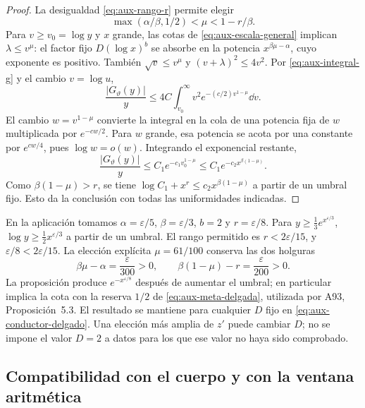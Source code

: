 \begin{proof}
La desigualdad \eqref{eq:aux-rango-r} permite elegir
\begin{equation}
 \max(\alpha/\beta,1/2)<\mu<1-r/\beta.
 \label{eq:aux-mu}
\end{equation}
Para $v\ge v_0=\log y$ y $x$ grande, las cotas de
\eqref{eq:aux-escala-general} implican $\lambda\le v^\mu$:
el factor fijo $D(\log x)^b$ se absorbe en la potencia
$x^{\beta\mu-\alpha}$, cuyo exponente es positivo.
También $\sqrt v\le v^\mu$ y $(v+\lambda)^2\le4v^2$.
Por \eqref{eq:aux-integral-g} y el cambio $v=\log u$,
\begin{equation}
 \frac{|G_\vartheta(y)|}{y}
 \le4C\int_{v_0}^\infty
                 v^2e^{-(c/2)v^{1-\mu}}\dd v.
 \label{eq:aux-cola-delgada}
\end{equation}
El cambio $w=v^{1-\mu}$ convierte la integral en la cola de
una potencia fija de $w$ multiplicada por $e^{-cw/2}$.
Para $w$ grande, esa potencia se acota por una constante por
$e^{cw/4}$, pues $\log w=o(w)$. Integrando el exponencial restante,
\[
 \frac{|G_\vartheta(y)|}{y}
 \le C_1e^{-c_1v_0^{1-\mu}}
 \le C_1e^{-c_2x^{\beta(1-\mu)}}.
\]
Como $\beta(1-\mu)>r$, se tiene
$\log C_1+x^r\le c_2x^{\beta(1-\mu)}$ a partir de un umbral fijo.
Esto da la conclusión con todas las uniformidades indicadas.
\end{proof}

En la aplicación tomamos $\alpha=\varepsilon/5$,
$\beta=\varepsilon/3$, $b=2$ y $r=\varepsilon/8$.
Para $y\ge\tfrac13e^{x^{\varepsilon/3}}$,
$\log y\ge\tfrac12x^{\varepsilon/3}$ a partir de un umbral.
El rango permitido es $r<2\varepsilon/15$, y
$\varepsilon/8<2\varepsilon/15$. La elección explícita
$\mu=61/100$ conserva las dos holguras
\begin{equation}
 \beta\mu-\alpha=\frac{\varepsilon}{300}>0,
 \qquad \beta(1-\mu)-r=\frac{\varepsilon}{200}>0.
 \label{eq:aux-holguras}
\end{equation}
La proposición produce $e^{-x^{\varepsilon/8}}$ después de aumentar
el umbral; en particular implica la cota con la reserva $1/2$ de
\eqref{eq:aux-meta-delgada}, utilizada por A93, Proposición~5.3.
El resultado se mantiene para cualquier $D$ fijo en
\eqref{eq:aux-conductor-delgado}. Una elección más amplia de $z'$
puede cambiar $D$; no se impone el valor $D=2$ a datos para los que
ese valor no haya sido comprobado.

\subsection{Compatibilidad con el cuerpo y con la ventana aritmética}


